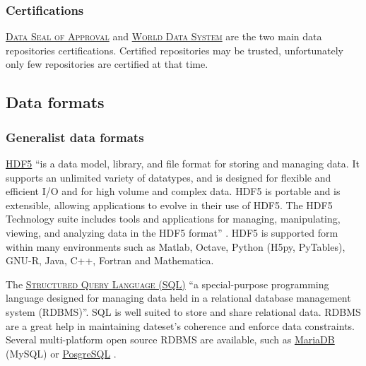 \subsubsection{Certifications}
\noindent {} \textsc{\href{http://www.datasealofapproval.org/en/}{Data Seal of Approval}} and \noindent {} \textsc{\href{http://www.icsu-wds.org/}{World Data System}} are the two main data repositories certifications. Certified repositories may be trusted, unfortunately only few repositories are certified at that time. 

\subsection{Data formats}
\label{data_formats}

\subsubsection{Generalist data formats}

\noindent {}  \textsc{\href{https://www.hdfgroup.org/HDF5/}{HDF5}} ``is a data model, library, and file format for storing and managing data. It supports an unlimited variety of datatypes, and is designed for flexible and efficient I/O and for high volume and complex data. HDF5 is portable and is extensible, allowing applications to evolve in their use of HDF5. The HDF5 Technology suite includes tools and applications for managing, manipulating, viewing, and analyzing data in the HDF5 format'' \cite{hdf_group_hdf5_2015}. HDF5 is supported form within many environments such as Matlab, Octave, Python (H5py, PyTables), GNU-R, Java, C++, Fortran and Mathematica.

\vspace{0.4cm}

\noindent The  \textsc{\href{https://en.wikipedia.org/wiki/SQL}{Structured Query Language (SQL)}} ``a special-purpose programming language designed for managing data held in a relational database management system (RDBMS)''\cite{wikipedia_sql_2015}. SQL is well suited to store and share relational data. RDBMS are a great help in maintaining dateset's coherence and enforce data constraints. Several multi-platform open source RDBMS are available, such as \href{https://mariadb.org/}{MariaDB} (MySQL) \cite{mariadb_mariadb_2015} or \href{http://www.postgresql.org/}{PosgreSQL} \cite{postgresql_postgresql:_2015}.

